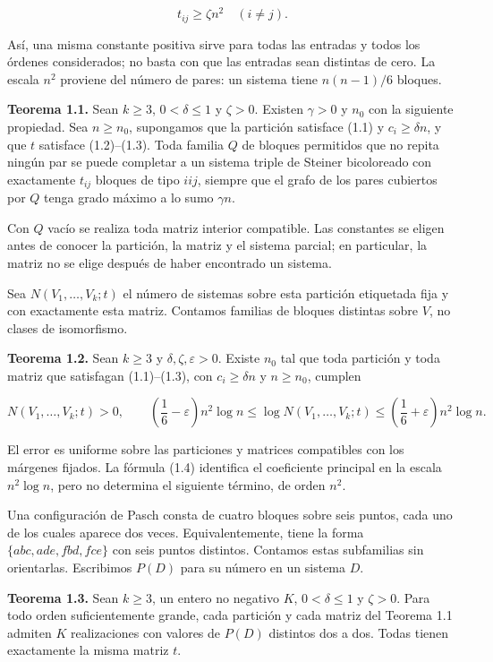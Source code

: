 \documentclass[spanish,11pt,a4paper]{article}
\begin{document}
\[t_{ij}\ge\zeta n^2\quad(i\ne j).\tag{1.3}\]

Así, una misma constante positiva sirve para todas las entradas y todos los órdenes considerados; no basta con que las entradas sean distintas de cero. La escala \(n^2\) proviene del número de pares: un sistema tiene \(n(n-1)/6\) bloques.

\textbf{Teorema 1.1.} Sean \(k\ge3\), \(0<\delta\le1\) y \(\zeta>0\). Existen \(\gamma>0\) y \(n_0\) con la siguiente propiedad. Sea \(n\ge n_0\), supongamos que la partición satisface (1.1) y \(c_i\ge\delta n\), y que \(t\) satisface (1.2)--(1.3). Toda familia \(Q\) de bloques permitidos que no repita ningún par se puede completar a un sistema triple de Steiner bicoloreado con exactamente \(t_{ij}\) bloques de tipo \(iij\), siempre que el grafo de los pares cubiertos por \(Q\) tenga grado máximo a lo sumo \(\gamma n\).

Con \(Q\) vacío se realiza toda matriz interior compatible. Las constantes se eligen antes de conocer la partición, la matriz y el sistema parcial; en particular, la matriz no se elige después de haber encontrado un sistema.

Sea \(N(V_1,\ldots,V_k;t)\) el número de sistemas sobre esta partición etiquetada fija y con exactamente esta matriz. Contamos familias de bloques distintas sobre \(V\), no clases de isomorfismo.

\textbf{Teorema 1.2.} Sean \(k\ge3\) y \(\delta,\zeta,\varepsilon>0\). Existe \(n_0\) tal que toda partición y toda matriz que satisfagan (1.1)--(1.3), con \(c_i\ge\delta n\) y \(n\ge n_0\), cumplen

\[N(V_1,\ldots,V_k;t)>0,
\qquad
\left(\frac16-\varepsilon\right)n^2\log n
\le\log N(V_1,\ldots,V_k;t)
\le\left(\frac16+\varepsilon\right)n^2\log n.
\tag{1.4}\]

El error es uniforme sobre las particiones y matrices compatibles con los márgenes fijados. La fórmula (1.4) identifica el coeficiente principal en la escala \(n^2\log n\), pero no determina el siguiente término, de orden \(n^2\).

Una configuración de Pasch consta de cuatro bloques sobre seis puntos, cada uno de los cuales aparece dos veces. Equivalentemente, tiene la forma \(\{abc,ade,fbd,fce\}\) con seis puntos distintos. Contamos estas subfamilias sin orientarlas. Escribimos \(P(D)\) para su número en un sistema \(D\).

\textbf{Teorema 1.3.} Sean \(k\ge3\), un entero no negativo \(K\), \(0<\delta\le1\) y \(\zeta>0\). Para todo orden suficientemente grande, cada partición y cada matriz del Teorema 1.1 admiten \(K\) realizaciones con valores de \(P(D)\) distintos dos a dos. Todas tienen exactamente la misma matriz \(t\).
\end{document}
